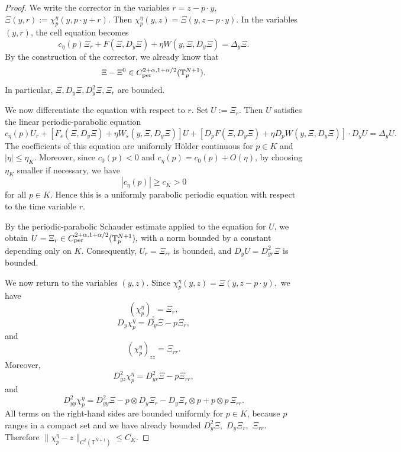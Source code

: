 \documentclass[preprint]{elsarticle}
\numberwithin{equation}{section}
\begin{document}
\begin{proof}
We write the corrector in the variables
$
r=z-p\cdot y,
$ $
\Xi(y,r):=\chi_p^\eta(y,p\cdot y+r).
$
Then
$
\chi_p^\eta(y,z)=\Xi(y,z-p\cdot y).
$
In the variables $(y,r)$, the cell equation becomes
\begin{equation*}
c_\eta(p)\Xi_r
+
F(\Xi,D_y\Xi)
+
\eta W(y,\Xi,D_y\Xi)
=
\Delta_y\Xi.
\end{equation*}
By the construction of the corrector, we already know that
\begin{equation*}
\Xi-\Xi^0\in C_{\rm per}^{2+\alpha,1+\alpha/2}(\mathbb T_p^{N+1}).
\end{equation*}
In particular,
$
\Xi,D_y\Xi, D_y^2\Xi, \Xi_r
$
are bounded.

We now differentiate the equation with respect to $r$. Set
$
U:=\Xi_r.
$
Then $U$ satisfies the linear periodic-parabolic equation
\begin{equation*}
c_\eta(p)U_r
+
\left[
F_s(\Xi,D_y\Xi)
+
\eta W_s(y,\Xi,D_y\Xi)
\right]U
+
\left[
D_pF(\Xi,D_y\Xi)
+
\eta D_pW(y,\Xi,D_y\Xi)
\right]\cdot D_yU
=
\Delta_yU.
\end{equation*}
The coefficients of this equation are uniformly Hölder continuous for $p\in K$ and $|\eta|\le\eta_K$. Moreover, since $c_0(p)<0$ and $c_\eta(p)=c_0(p)+O(\eta)$, by choosing $\eta_K$ smaller if necessary, we have
\begin{equation*}
|c_\eta(p)|\ge c_K>0
\end{equation*}
for all $p\in K$. Hence this is a uniformly parabolic periodic equation with respect to the time variable $r$.

By the periodic-parabolic Schauder estimate applied to the equation for $U$, we obtain $U=\Xi_r\in C_{\rm per}^{2+\alpha,1+\alpha/2}(\mathbb T_p^{N+1}),$
with a norm bounded by a constant depending only on $K$. Consequently,
$
U_r=\Xi_{rr}
$
is bounded, and
$
D_yU=D^2_{yr}\Xi
$
is bounded.

We now return to the variables $(y,z)$. Since
$
\chi_p^\eta(y,z)=\Xi(y,z-p\cdot y),
$
we have
$$
(\chi_p^\eta)_z=\Xi_r,
$$
$$
D_y\chi_p^\eta=D_y\Xi-p\Xi_r,
$$
and
\begin{equation*}
(\chi_p^\eta)_{zz}=\Xi_{rr}.
\end{equation*}
Moreover,
\begin{equation*}
D^2_{yz}\chi_p^\eta
=
D^2_{yr}\Xi-p\Xi_{rr},
\end{equation*}
and
\begin{equation*}
D^2_{yy}\chi_p^\eta
=
D^2_{yy}\Xi
-
p\otimes D_y\Xi_r
-
D_y\Xi_r\otimes p
+
p\otimes p\,\Xi_{rr}.
\end{equation*}
All terms on the right-hand sides are bounded uniformly for $p\in K$, because $p$ ranges in a compact set and we have already bounded
$
D_y^2\Xi,$ $ D_y\Xi_r,$ $ \Xi_{rr}.
$
Therefore $\|\chi_p^\eta-z\|_{C^2(\mathbb T^{N+1})}\le C_K.$
\end{proof}
\end{document}
